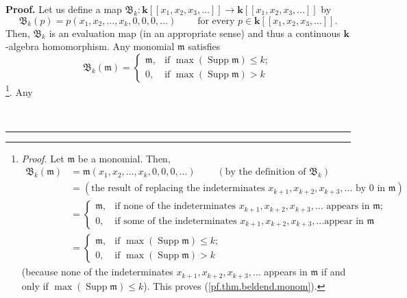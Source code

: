 \documentclass[numbers=enddot,12pt,final,onecolumn,notitlepage,abstracton]{scrartcl}%
\theoremstyle{definition}
\newenvironment{proof}[1][Proof]{\noindent\textbf{#1.} }{\ \rule{0.5em}{0.5em}}
\newenvironment{verlong}{}{}
\begin{document}
\begin{proof}
\begin{verlong}
Let us define a map $\mathfrak{B}_{k}:\mathbf{k}\left[  \left[  x_{1}%
,x_{2},x_{3},\ldots\right]  \right]  \rightarrow\mathbf{k}\left[  \left[
x_{1},x_{2},x_{3},\ldots\right]  \right]  $ by%
\[
\mathfrak{B}_{k}\left(  p\right)  =p\left(  x_{1},x_{2},\ldots,x_{k}%
,0,0,0,\ldots\right)  \ \ \ \ \ \ \ \ \ \ \text{for every }p\in\mathbf{k}%
\left[  \left[  x_{1},x_{2},x_{3},\ldots\right]  \right]  .
\]
Then, $\mathfrak{B}_{k}$ is an evaluation map (in an appropriate sense) and
thus a continuous $\mathbf{k}$-algebra homomorphism. Any monomial
$\mathfrak{m}$ satisfies%
\begin{equation}
\mathfrak{B}_{k}\left(  \mathfrak{m}\right)  =%
\begin{cases}
\mathfrak{m}, & \text{if }\max\left(  \operatorname*{Supp}\mathfrak{m}\right)
\leq k;\\
0, & \text{if }\max\left(  \operatorname*{Supp}\mathfrak{m}\right)  >k
\end{cases}
\label{pf.thm.beldend.monom}%
\end{equation}
\footnote{\textit{Proof.} Let $\mathfrak{m}$ be a monomial. Then,%
\begin{align*}
\mathfrak{B}_{k}\left(  \mathfrak{m}\right)   &  =\mathfrak{m}\left(
x_{1},x_{2},\ldots,x_{k},0,0,0,\ldots\right)  \ \ \ \ \ \ \ \ \ \ \left(
\text{by the definition of }\mathfrak{B}_{k}\right) \\
&  =\left(  \text{the result of replacing the indeterminates }x_{k+1}%
,x_{k+2},x_{k+3},\ldots\text{ by }0\text{ in }\mathfrak{m}\right) \\
&  =%
\begin{cases}
\mathfrak{m}, & \text{if none of the indeterminates }x_{k+1},x_{k+2}%
,x_{k+3},\ldots\text{ appears in }\mathfrak{m}\text{;}\\
0, & \text{if some of the indeterminates }x_{k+1},x_{k+2},x_{k+3},\ldots\text{
appear in }\mathfrak{m}%
\end{cases}
\\
&  =%
\begin{cases}
\mathfrak{m}, & \text{if }\max\left(  \operatorname*{Supp}\mathfrak{m}\right)
\leq k;\\
0, & \text{if }\max\left(  \operatorname*{Supp}\mathfrak{m}\right)  >k
\end{cases}
\end{align*}
(because none of the indeterminates $x_{k+1},x_{k+2},x_{k+3},\ldots$ appears
in $\mathfrak{m}$ if and only if $\max\left(  \operatorname*{Supp}%
\mathfrak{m}\right)  \leq k$). This proves (\ref{pf.thm.beldend.monom}).}. Any

\end{verlong}
\end{proof}
\end{document}
